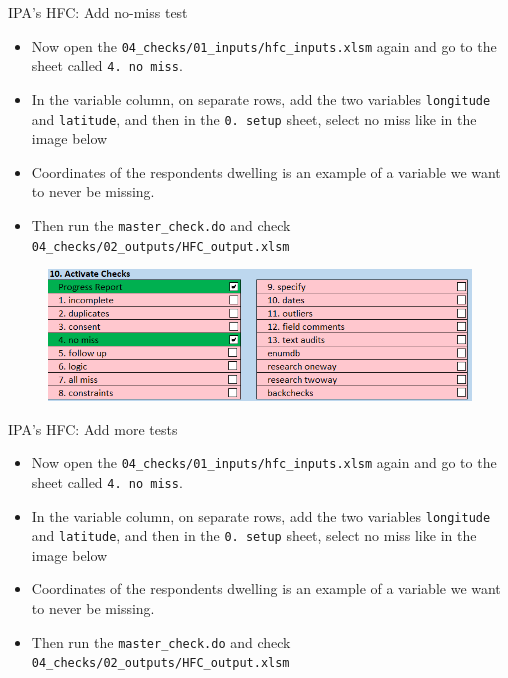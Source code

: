 \documentclass[aspectratio=169]{beamer}
\begin{document}
\begin{frame}{IPA's HFC: Add no-miss test}

	\begin{itemize}
		\item \small Now open the \texttt{04\_checks/01\_inputs/hfc\_inputs.xlsm} again and go to the sheet called \texttt{4. no miss}.
		\item \small In the variable column, on separate rows, add the two variables \texttt{longitude} and \texttt{latitude}, and then in the \texttt{0. setup} sheet, select no miss like in the image below
		\item \small Coordinates of the respondents dwelling is an example of a variable we want to never be missing.
		\item \small Then run the \texttt{master\_check.do} and check \texttt{04\_checks/02\_outputs/HFC\_output.xlsm} 
	\end{itemize}

	\begin{figure}
		\centering
		\includegraphics[width=.75\linewidth]{img/ipacheck-setup-nomiss.png}
	\end{figure}
\end{frame}

\begin{frame}{IPA's HFC: Add more tests}
	\begin{itemize}
		\item \small Now open the \texttt{04\_checks/01\_inputs/hfc\_inputs.xlsm} again and go to the sheet called \texttt{4. no miss}.
		\item \small In the variable column, on separate rows, add the two variables \texttt{longitude} and \texttt{latitude}, and then in the \texttt{0. setup} sheet, select no miss like in the image below
		\item \small Coordinates of the respondents dwelling is an example of a variable we want to never be missing.
		\item \small Then run the \texttt{master\_check.do} and check \texttt{04\_checks/02\_outputs/HFC\_output.xlsm} 
	\end{itemize}
\end{frame}
\end{document}
